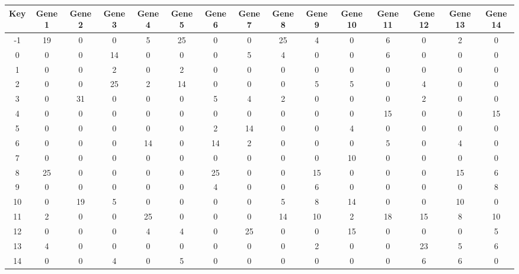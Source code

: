 \begin{tabular}{|c|c|c|c|c|c|c|c|c|c|c|c|c|c|c|}
\hline
Key & Gene 1 & Gene 2 & Gene 3 & Gene 4 & Gene 5 & Gene 6 & Gene 7 & Gene 8 & Gene 9 & Gene 10 & Gene 11 & Gene 12 & Gene 13 & Gene 14 \\
\hline
-1 & 19 & 0 & 0 & 5 & 25 & 0 & 0 & 25 & 4 & 0 & 6 & 0 & 2 & 0 \\
0 & 0 & 0 & 14 & 0 & 0 & 0 & 5 & 4 & 0 & 0 & 6 & 0 & 0 & 0 \\
1 & 0 & 0 & 2 & 0 & 2 & 0 & 0 & 0 & 0 & 0 & 0 & 0 & 0 & 0 \\
2 & 0 & 0 & 25 & 2 & 14 & 0 & 0 & 0 & 5 & 5 & 0 & 4 & 0 & 0 \\
3 & 0 & 31 & 0 & 0 & 0 & 5 & 4 & 2 & 0 & 0 & 0 & 2 & 0 & 0 \\
4 & 0 & 0 & 0 & 0 & 0 & 0 & 0 & 0 & 0 & 0 & 15 & 0 & 0 & 15 \\
5 & 0 & 0 & 0 & 0 & 0 & 2 & 14 & 0 & 0 & 4 & 0 & 0 & 0 & 0 \\
6 & 0 & 0 & 0 & 14 & 0 & 14 & 2 & 0 & 0 & 0 & 5 & 0 & 4 & 0 \\
7 & 0 & 0 & 0 & 0 & 0 & 0 & 0 & 0 & 0 & 10 & 0 & 0 & 0 & 0 \\
8 & 25 & 0 & 0 & 0 & 0 & 25 & 0 & 0 & 15 & 0 & 0 & 0 & 15 & 6 \\
9 & 0 & 0 & 0 & 0 & 0 & 4 & 0 & 0 & 6 & 0 & 0 & 0 & 0 & 8 \\
10 & 0 & 19 & 5 & 0 & 0 & 0 & 0 & 5 & 8 & 14 & 0 & 0 & 10 & 0 \\
11 & 2 & 0 & 0 & 25 & 0 & 0 & 0 & 14 & 10 & 2 & 18 & 15 & 8 & 10 \\
12 & 0 & 0 & 0 & 4 & 4 & 0 & 25 & 0 & 0 & 15 & 0 & 0 & 0 & 5 \\
13 & 4 & 0 & 0 & 0 & 0 & 0 & 0 & 0 & 2 & 0 & 0 & 23 & 5 & 6 \\
14 & 0 & 0 & 4 & 0 & 5 & 0 & 0 & 0 & 0 & 0 & 0 & 6 & 6 & 0 \\
\hline
\end{tabular}